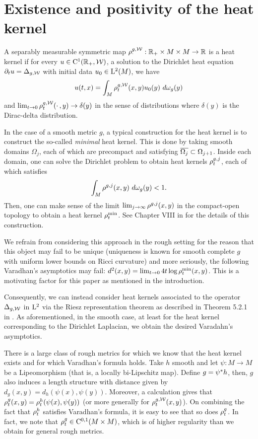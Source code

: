 \documentclass[a4paper, 12pt]{amsart}
\begin{document}
\section{Existence and positivity of the heat kernel}

\begin{defn}
A separably measurable symmetric map $\rho^{g,\mathcal{W}}_{\cdotp}: \mathbb{R}_+ \times M \times M \to \mathbb{R}$ is a heat kernel if for every $u \in {\rm C}^{1}_{\rm {}}(\mathbb{R}_+, \mathcal{W})$, a solution to the Dirichlet heat equation $\partial_t u = \Delta_{g,\mathcal{W}}$ with initial data $u_0 \in {\rm L}^{2}_{\rm {}}(M)$, we have
\[
u(t,x) = \int_{M} \rho^{g,\mathcal{W}}_t(x,y) u_0(y)\ d\omega_g(y)
\]
and
$\lim_{t \to 0} \rho_t^{g,\mathcal{W}}(\cdotp,y) \to \delta(y)$ in the sense of distributions where $\delta(y)$ is the Dirac-delta distribution.
\end{defn}

In the case of a smooth metric $g$, a typical construction for
the heat kernel is to construct the so-called \emph{minimal} heat kernel.
This is done by taking smooth domains $\Omega_j$, 
each of which are precompact and satisfying $\overline{\Omega_j} \subset \Omega_{j+1}$. 
Inside each domain, one can solve the Dirichlet problem
to obtain heat kernels $\rho^{g,j}_{t}$, each of which
satisfies 
$$ \int_{M} \hk^{g,j}(x,y)\ d\omega_g(y) < 1.$$
Then, one can make sense of the limit $\lim_{j \to \infty} \rho^{g,j}(x,y)$
in the compact-open topology to obtain a heat kernel $\rho^{\min}_t$.
See Chapter VIII in \cite{Chavel} for the details
of this construction.

We refrain from considering this approach in the rough setting 
for the reason that this object may fail to be unique (uniqueness
is known for smooth complete $g$ with 
uniform lower bounds on Ricci curvature) and more seriously, the following
Varadhan's asymptotics may fail: 
$d^2(x,y) = \lim_{t \to 0} 4t \log \rho^{\min}_t(x,y)$.
This is a motivating factor for this paper as mentioned in the 
introduction.

Consequently, we can instead consider heat kernels
associated to the operator $\Delta_{g,\mathcal{W}}$ in ${\rm L}^{2}_{\rm {}}$
via the Riesz representation theorem as described in Theorem 
5.2.1 in \cite{Davies}. As aforementioned, in the smooth case,
at least for the heat kernel corresponding to the 
Dirichlet Laplacian, we obtain the desired  Varadahn's
asymptotics.  

There is a large class of rough metrics
for which we know that the heat kernel exists
and for which Varadhan's formula holds. 
Take $h$ smooth and let $\psi:M \to M$
be a Lipeomorphism (that is, a locally bi-Lipschitz map).
Define $g = {\psi}^\ast h$, then, $g$ 
also induces a length structure with 
distance given by $d_g(x,y) = d_h(\psi(x), \psi(y))$.
Moreover, a calculation gives
that $\rho^{g}_t(x,y) = \rho^{h}_t(\psi(x), \psi(y))$
(or more generally for $\rho^{g,\mathcal{W}}_t(x,y)$). 
On combining the fact that $\rho^h_t$ satisfies
Varadhan's formula, it is easy to see that
so does $\rho^{g}_t$. In fact, we 
note that $\rho^g_t \in {\rm C}^{0,1}_{\rm {}}(M \times M)$,
which is of higher regularity than we
obtain for general rough metrics.
\end{document}
